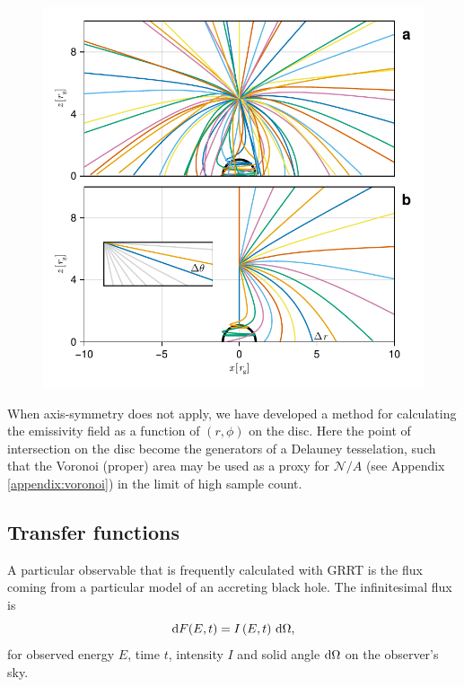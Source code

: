 \begin{figure}
    \centering
    \includegraphics[width=0.95\linewidth]{figures/emissivity.coronal-traces.pdf}
    \caption{}
    \label{fig:coronal-tracing}
\end{figure}

When axis-symmetry does not apply, we have developed a method for calculating the emissivity field as a function of $(r, \phi)$ on the disc. Here the point of intersection on the disc become the generators of a Delauney tesselation, such that the Voronoi (proper) area may be used as a proxy for $\mathcal{N} / A$ (see Appendix \ref{appendix:voronoi}) in the limit of high sample count.

\subsection{Transfer functions}

A particular observable that is frequently calculated with GRRT is the flux coming from a particular model of an accreting black hole. The infinitesimal flux is
\begin{equation}
\text{d} F(E, t) = I\left(E, t\right)\, \text{d} \Omega,
\end{equation}
for observed energy $E$, time $t$, intensity $I$ and solid angle $\text{d} \Omega$ on the observer's sky.

